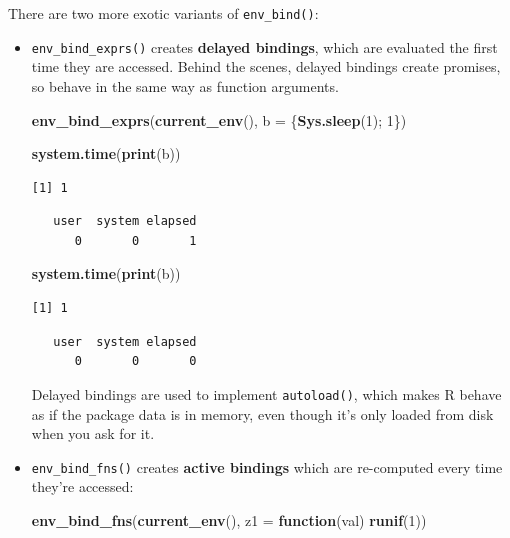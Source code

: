 \documentclass[]{book}
\newenvironment{Shaded}{\begin{snugshade}}{\end{snugshade}}
\newcommand{\ControlFlowTok}[1]{\textcolor[rgb]{0.13,0.29,0.53}{\textbf{#1}}}
\newcommand{\DataTypeTok}[1]{\textcolor[rgb]{0.13,0.29,0.53}{#1}}
\newcommand{\DecValTok}[1]{\textcolor[rgb]{0.00,0.00,0.81}{#1}}
\newcommand{\KeywordTok}[1]{\textcolor[rgb]{0.13,0.29,0.53}{\textbf{#1}}}
\newcommand{\NormalTok}[1]{#1}
\theoremstyle{definition}
\theoremstyle{definition}
\theoremstyle{definition}
\theoremstyle{remark}
\begin{document}
There are two more exotic variants of \texttt{env\_bind()}:

\begin{itemize}
\item
  \texttt{env\_bind\_exprs()} creates \textbf{delayed bindings}, which
  are evaluated the first time they are accessed. Behind the scenes,
  delayed bindings create promises, so behave in the same way as
  function arguments.

\begin{Shaded}
\begin{Highlighting}[]
\KeywordTok{env_bind_exprs}\NormalTok{(}\KeywordTok{current_env}\NormalTok{(), }\DataTypeTok{b =}\NormalTok{ \{}\KeywordTok{Sys.sleep}\NormalTok{(}\DecValTok{1}\NormalTok{); }\DecValTok{1}\NormalTok{\})}

\KeywordTok{system.time}\NormalTok{(}\KeywordTok{print}\NormalTok{(b))}
\end{Highlighting}
\end{Shaded}

\begin{verbatim}
[1] 1
\end{verbatim}

\begin{verbatim}
   user  system elapsed 
      0       0       1 
\end{verbatim}

\begin{Shaded}
\begin{Highlighting}[]
\KeywordTok{system.time}\NormalTok{(}\KeywordTok{print}\NormalTok{(b))}
\end{Highlighting}
\end{Shaded}

\begin{verbatim}
[1] 1
\end{verbatim}

\begin{verbatim}
   user  system elapsed 
      0       0       0 
\end{verbatim}

  Delayed bindings are used to implement \texttt{autoload()}, which
  makes R behave as if the package data is in memory, even though it's
  only loaded from disk when you ask for it.
\item
  \texttt{env\_bind\_fns()} creates \textbf{active bindings} which are
  re-computed every time they're accessed:

\begin{Shaded}
\begin{Highlighting}[]
\KeywordTok{env_bind_fns}\NormalTok{(}\KeywordTok{current_env}\NormalTok{(), }\DataTypeTok{z1 =} \ControlFlowTok{function}\NormalTok{(val) }\KeywordTok{runif}\NormalTok{(}\DecValTok{1}\NormalTok{))}


\end{Highlighting}
\end{Shaded}
\end{itemize}
\end{document}
